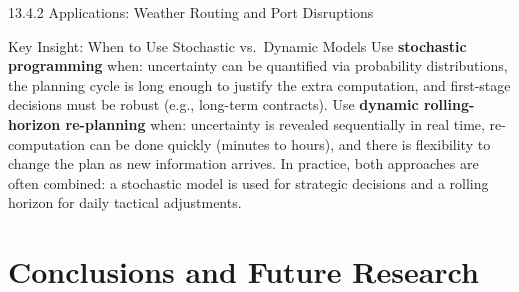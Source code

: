 \documentclass[aspectratio=169,10pt]{beamer}
\begin{document}
\begin{frame}[allowframebreaks]{13.4.2 Applications: Weather Routing and Port Disruptions}
  \begin{alertblock}{Key Insight: When to Use Stochastic vs.\ Dynamic Models}
    Use \textbf{stochastic programming} when: uncertainty can be quantified
    via probability distributions, the planning cycle is long enough to
    justify the extra computation, and first-stage decisions must be robust
    (e.g., long-term contracts).
    Use \textbf{dynamic rolling-horizon re-planning} when: uncertainty is
    revealed sequentially in real time, re-computation can be done quickly
    (minutes to hours), and there is flexibility to change the plan as
    new information arrives.  In practice, both approaches are often combined:
    a stochastic model is used for strategic decisions and a rolling horizon
    for daily tactical adjustments.
  \end{alertblock}
\end{frame}

\section{Conclusions and Future Research}
\end{document}
